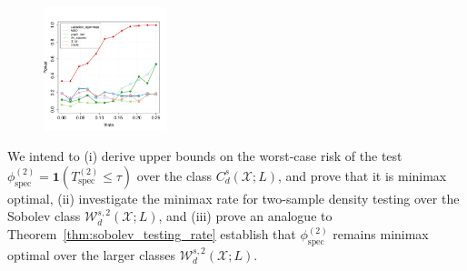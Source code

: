\documentclass{article}
\newcommand{\1}{\mathbf{1}}
\theoremstyle{alden}
\theoremstyle{aldenthm}
\theoremstyle{definition}
\theoremstyle{remark}
\begin{document}
\begin{figure}
	\includegraphics[width=0.32\textwidth]{plots/stepfunction_sin3_theta}
\end{figure}

We intend to (i) derive upper bounds on the worst-case risk of the test $\phi_{\mathrm{spec}}^{(2)} = \1(T_{\mathrm{spec}}^{(2)} \leq \tau)$ over the class $C_d^{s}(\mathcal{X};L)$, and prove that it is minimax optimal, (ii) investigate the minimax rate for two-sample density testing over the Sobolev class $\mathcal{W}_d^{s,2}(\mathcal{X};L)$, and (iii) prove an analogue to Theorem~\ref{thm:sobolev_testing_rate} establish that $\phi_{\mathrm{spec}}^{(2)}$ remains minimax optimal over the larger classes $\mathcal{W}_d^{s,2}(\mathcal{X};L)$. 
\end{document}

